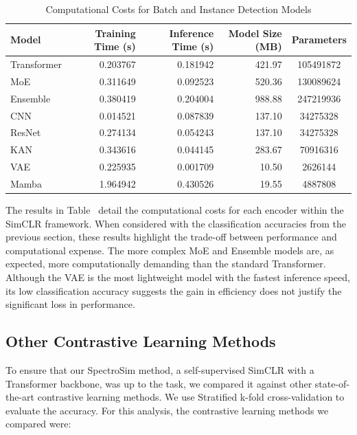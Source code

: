 \begin{table}[t]
\small %
\centering %
\caption{Computational Costs for Batch and Instance Detection Models}
\label{tab:comp_cost_combined}
\begin{tabular}{lrrrc} %
\toprule
\textbf{Model} & \textbf{Training Time (s)} & \textbf{Inference Time (s)} & \textbf{Model Size (MB)} & \textbf{Parameters} \\
\midrule
Transformer & 0.203767 & 0.181942 & 421.97 & \num{105491872} \\
MoE & 0.311649 & 0.092523 & 520.36 & \num{130089624} \\
Ensemble & 0.380419 & 0.204004 & 988.88 & \num{247219936} \\
CNN & 0.014521 & 0.087839 & 137.10 & \num{34275328} \\
ResNet & 0.274134 & 0.054243 & 137.10 & \num{34275328} \\
KAN & 0.343616 & 0.044145 & 283.67 & \num{70916316} \\
VAE & 0.225935 & 0.001709 & 10.50 & \num{2626144} \\
Mamba & 1.964942 & 0.430526 & 19.55 & \num{4887808} \\
\bottomrule
\end{tabular}
\end{table}


The results in Table~ detail the computational costs for each encoder within the SimCLR framework. When considered with the classification accuracies from the previous section, these results highlight the trade-off between performance and computational expense. 
The more complex MoE and Ensemble models are, as expected, more computationally demanding than the standard Transformer. Although the VAE is the most lightweight model with the fastest inference speed, its low classification accuracy suggests the gain in efficiency does not justify the significant loss in performance.

\subsection{Other Contrastive Learning Methods}

To ensure that our SpectroSim method, a self-supervised SimCLR with a Transformer backbone, was up to the task, we compared it against other state-of-the-art contrastive learning methods. We use Stratified k-fold cross-validation to evaluate the accuracy. For this analysis, the contrastive learning methods we compared were:

